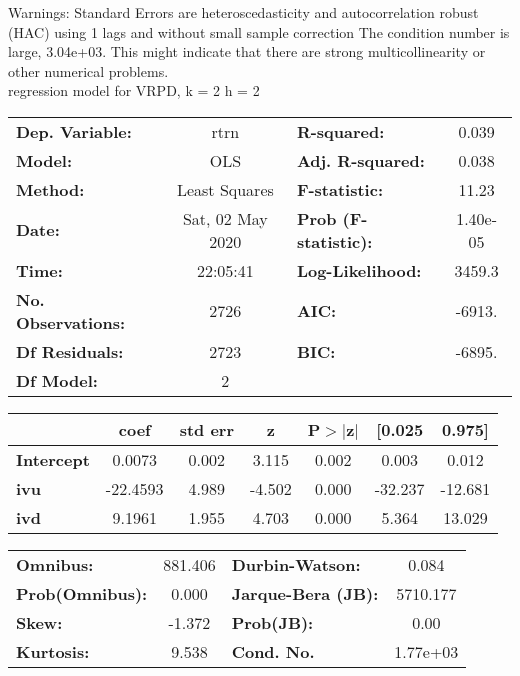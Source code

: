 Warnings: \newline
 [1] Standard Errors are heteroscedasticity and autocorrelation robust (HAC) using 1 lags and without small sample correction \newline
 [2] The condition number is large, 3.04e+03. This might indicate that there are \newline
 strong multicollinearity or other numerical problems.\\ 

regression model for VRPD, k = 2 h = 2\begin{center}
\begin{tabular}{lclc}
\toprule
\textbf{Dep. Variable:}    &       rtrn       & \textbf{  R-squared:         } &     0.039   \\
\textbf{Model:}            &       OLS        & \textbf{  Adj. R-squared:    } &     0.038   \\
\textbf{Method:}           &  Least Squares   & \textbf{  F-statistic:       } &     11.23   \\
\textbf{Date:}             & Sat, 02 May 2020 & \textbf{  Prob (F-statistic):} &  1.40e-05   \\
\textbf{Time:}             &     22:05:41     & \textbf{  Log-Likelihood:    } &    3459.3   \\
\textbf{No. Observations:} &        2726      & \textbf{  AIC:               } &    -6913.   \\
\textbf{Df Residuals:}     &        2723      & \textbf{  BIC:               } &    -6895.   \\
\textbf{Df Model:}         &           2      & \textbf{                     } &             \\
\bottomrule
\end{tabular}
\begin{tabular}{lcccccc}
                   & \textbf{coef} & \textbf{std err} & \textbf{z} & \textbf{P$> |$z$|$} & \textbf{[0.025} & \textbf{0.975]}  \\
\midrule
\textbf{Intercept} &       0.0073  &        0.002     &     3.115  &         0.002        &        0.003    &        0.012     \\
\textbf{ivu}       &     -22.4593  &        4.989     &    -4.502  &         0.000        &      -32.237    &      -12.681     \\
\textbf{ivd}       &       9.1961  &        1.955     &     4.703  &         0.000        &        5.364    &       13.029     \\
\bottomrule
\end{tabular}
\begin{tabular}{lclc}
\textbf{Omnibus:}       & 881.406 & \textbf{  Durbin-Watson:     } &    0.084  \\
\textbf{Prob(Omnibus):} &   0.000 & \textbf{  Jarque-Bera (JB):  } & 5710.177  \\
\textbf{Skew:}          &  -1.372 & \textbf{  Prob(JB):          } &     0.00  \\
\textbf{Kurtosis:}      &   9.538 & \textbf{  Cond. No.          } & 1.77e+03  \\
\bottomrule
\end{tabular}
\end{center}

